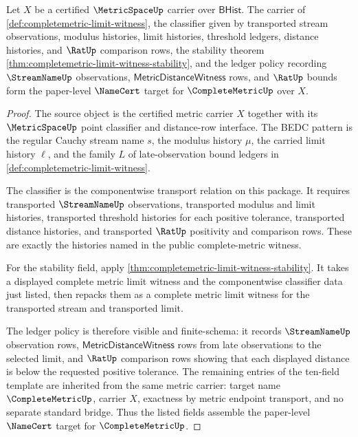 \begin{theorem}
\label{thm:completemetric-limit-witness-namecert-target}
Let $X$ be a certified $\MetricSpaceUp$ carrier over $\mathsf{BHist}$. The
carrier of \autoref{def:completemetric-limit-witness}, the classifier given
by transported stream observations, modulus histories, limit histories,
threshold ledgers, distance histories, and $\RatUp$ comparison rows, the
stability theorem
\autoref{thm:completemetric-limit-witness-stability}, and the ledger policy
recording $\StreamNameUp$ observations, $\mathsf{MetricDistanceWitness}$ rows,
and $\RatUp$ bounds form the paper-level $\NameCert$ target for
$\CompleteMetricUp$ over $X$.
\end{theorem}
\begin{proof}
The source object is the certified metric carrier $X$ together with its
$\MetricSpaceUp$ point classifier and distance-row interface. The BEDC pattern
is the regular Cauchy stream name $s$, the modulus history $\mu$, the carried
limit history $\ell$, and the family $L$ of late-observation bound ledgers in
\autoref{def:completemetric-limit-witness}.

The classifier is the componentwise transport relation on this package. It
requires transported $\StreamNameUp$ observations, transported modulus and
limit histories, transported threshold histories for each positive tolerance,
transported distance histories, and transported $\RatUp$ positivity and
comparison rows. These are exactly the histories named in the public
complete-metric witness.

For the stability field, apply
\autoref{thm:completemetric-limit-witness-stability}. It takes a displayed
complete metric limit witness and the componentwise classifier data just
listed, then repacks them as a complete metric limit witness for the
transported stream and transported limit.

The ledger policy is therefore visible and finite-schema: it records
$\StreamNameUp$ observation rows, $\mathsf{MetricDistanceWitness}$ rows from
late observations to the selected limit, and $\RatUp$ comparison rows showing
that each displayed distance is below the requested positive tolerance. The
remaining entries of the ten-field template are inherited from the same
metric carrier: target name $\CompleteMetricUp$, carrier $X$, exactness by
metric endpoint transport, and no separate standard bridge. Thus the listed
fields assemble the paper-level $\NameCert$ target for $\CompleteMetricUp$.
\end{proof}

